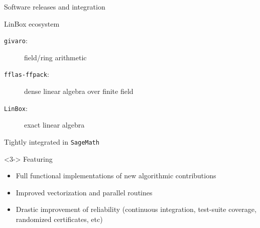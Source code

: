 \documentclass{beamer}
\begin{document}
\begin{frame}{Software releases and integration}
    \begin{block} {LinBox ecosystem}
      \begin{description}
        \item[\texttt{givaro}:] field/ring arithmetic
          \hfill{}
        \item[\texttt{fflas-ffpack}:] dense linear algebra over finite field \hfill{}
        \item[\texttt{LinBox}:] exact linear algebra \hfill{}
      \end{description}
      Tightly integrated  in \texttt{SageMath} \hfill{}
    \end{block}

    \begin{block}<3-> {Featuring}
      \begin{itemize}
      \item Full functional implementations of new algorithmic contributions
      \item Improved vectorization and parallel routines
      \item Drastic improvement of reliability (continuous integration,
        test-suite coverage, randomized certificates, etc)
      \end{itemize}
    \end{block}
\end{frame}
\end{document}
